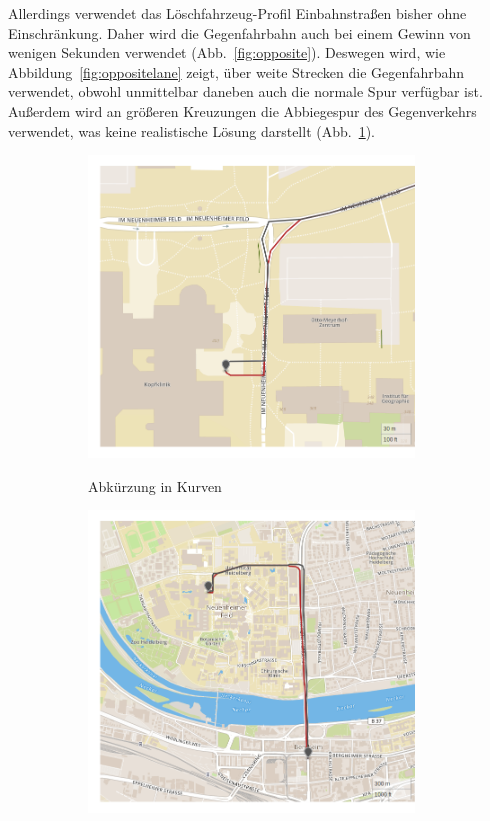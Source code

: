 Allerdings verwendet das Löschfahrzeug-Profil Einbahnstraßen bisher ohne Einschränkung.
Daher wird die Gegenfahrbahn auch bei einem Gewinn von wenigen Sekunden verwendet (Abb.~\ref{fig:opposite}).
Deswegen wird, wie Abbildung~\ref{fig:oppositelane} zeigt, über weite Strecken die Gegenfahrbahn verwendet, obwohl unmittelbar daneben auch die normale Spur verfügbar ist.
Außerdem wird an größeren Kreuzungen die Abbiegespur des Gegenverkehrs verwendet, was keine realistische Lösung darstellt (Abb.~\ref{fig:oppositecurve}).


\begin{figure}[htb]
\centering
\begin{subfigure}{0.49\textwidth}
\centering
\includegraphics[width = 0.95\textwidth]{../media/oppositecurve.png} \\
\caption{Abkürzung in Kurven}
\label{fig:oppositecurve}
\end{subfigure}
\begin{subfigure}{0.49\textwidth}
\centering
\includegraphics[width = 0.95\textwidth]{../media/oppositelane.png} \\

\end{subfigure}
\end{figure}
